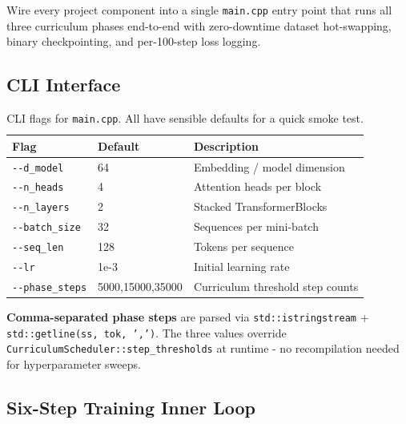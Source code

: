 \documentclass[12pt, a4paper]{article}
\begin{document}
\begin{tcolorbox}[designbox, title={Step 4.2 Goal}]
  Wire every project component into a single \texttt{main.cpp} entry point
  that runs all three curriculum phases end-to-end with zero-downtime dataset
  hot-swapping, binary checkpointing, and per-100-step loss logging.
\end{tcolorbox}

\subsection{CLI Interface}

\begin{table}[!ht]
\centering
\renewcommand{\arraystretch}{1.3}
\begin{tabular}{@{} l l p{10cm} @{}}
\toprule
\textbf{Flag} & \textbf{Default} & \textbf{Description} \\
\midrule
\texttt{-{}-d\_model}     & 64            & Embedding / model dimension \\
\texttt{-{}-n\_heads}     & 4             & Attention heads per block \\
\texttt{-{}-n\_layers}    & 2             & Stacked TransformerBlocks \\
\texttt{-{}-batch\_size}  & 32            & Sequences per mini-batch \\
\texttt{-{}-seq\_len}     & 128           & Tokens per sequence \\
\texttt{-{}-lr}           & 1e-3          & Initial learning rate \\
\texttt{-{}-phase\_steps} & 5000,15000,35000 & Curriculum threshold step counts \\
\bottomrule
\end{tabular}
\caption{CLI flags for \texttt{main.cpp}.  All have sensible defaults for a quick smoke test.}
\end{table}

\textbf{Comma-separated phase steps} are parsed via
\texttt{std::istringstream} + \texttt{std::getline(ss, tok, ',')}.
The three values override \texttt{CurriculumScheduler::step\_thresholds} at
runtime - no recompilation needed for hyperparameter sweeps.

\subsection{Six-Step Training Inner Loop}
\end{document}

